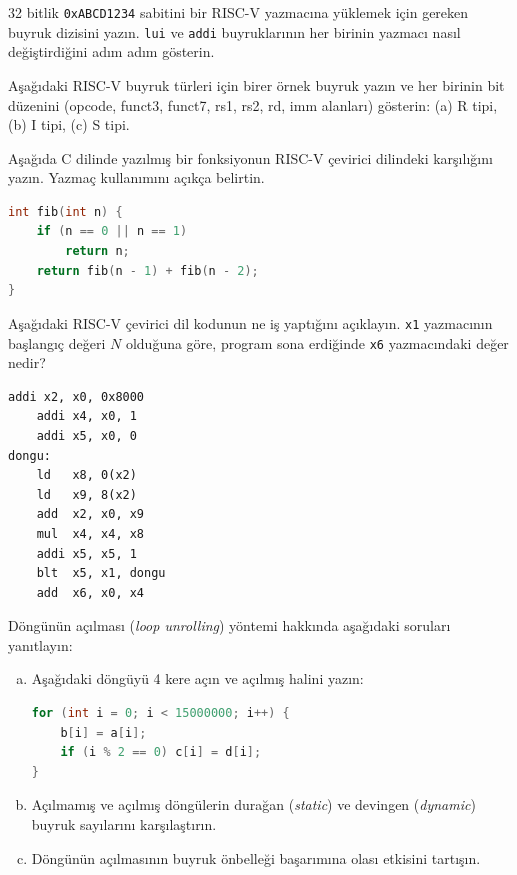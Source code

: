 \begin{alistirma}[\orta]
32 bitlik \texttt{0xABCD1234} sabitini bir RISC-V yazmacına yüklemek için gereken buyruk dizisini yazın. \texttt{lui} ve \texttt{addi} buyruklarının her birinin yazmacı nasıl değiştirdiğini adım adım gösterin.
\end{alistirma}


\begin{alistirma}[\orta]
Aşağıdaki RISC-V buyruk türleri için birer örnek buyruk yazın ve her birinin bit düzenini (opcode, funct3, funct7, rs1, rs2, rd, imm alanları) gösterin: (a) R tipi, (b) I tipi, (c) S tipi.
\end{alistirma}

\begin{alistirma}[\zor]
Aşağıda C dilinde yazılmış bir fonksiyonun RISC-V çevirici dilindeki karşılığını yazın. Yazmaç kullanımını açıkça belirtin.
\begin{lstlisting}[language=C, style=alistirma-kod]
int fib(int n) {
    if (n == 0 || n == 1)
        return n;
    return fib(n - 1) + fib(n - 2);
}
\end{lstlisting}
\end{alistirma}

\begin{alistirma}[\zor]
Aşağıdaki RISC-V çevirici dil kodunun ne iş yaptığını açıklayın. \texttt{x1} yazmacının başlangıç değeri $N$ olduğuna göre, program sona erdiğinde \texttt{x6} yazmacındaki değer nedir?
\begin{lstlisting}[style=riscv, style=alistirma-kod]
    addi x2, x0, 0x8000
    addi x4, x0, 1
    addi x5, x0, 0
dongu:
    ld   x8, 0(x2)
    ld   x9, 8(x2)
    add  x2, x0, x9
    mul  x4, x4, x8
    addi x5, x5, 1
    blt  x5, x1, dongu
    add  x6, x0, x4
\end{lstlisting}
\end{alistirma}

\begin{alistirma}[\zor]
Döngünün açılması (\emph{loop unrolling}) yöntemi hakkında aşağıdaki soruları yanıtlayın:
\begin{enumerate}[(a)]
    \item Aşağıdaki döngüyü 4 kere açın ve açılmış halini yazın:
\begin{lstlisting}[language=C, style=alistirma-kod]
for (int i = 0; i < 15000000; i++) {
    b[i] = a[i];
    if (i % 2 == 0) c[i] = d[i];
}
\end{lstlisting}
    \item Açılmamış ve açılmış döngülerin durağan (\emph{static}) ve devingen (\emph{dynamic}) buyruk sayılarını karşılaştırın.
    \item Döngünün açılmasının buyruk önbelleği başarımına olası etkisini tartışın.
\end{enumerate}
\end{alistirma}

